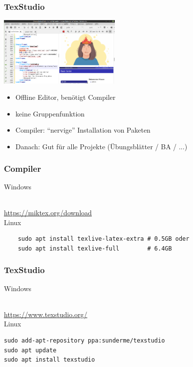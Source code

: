 \documentclass{beamer}
\begin{document}
\begin{frame}
	\frametitle{TexStudio}
	\includegraphics[width=6cm]{pictures/texstudio.png}
	\begin{itemize}[<+->]
		\item Offline Editor, benötigt Compiler
		\item keine Gruppenfunktion
		\item Compiler: ``nervige'' Installation von Paketen
		\item Danach: Gut für alle Projekte (Übungsblätter / BA / ...)
	\end{itemize}
\end{frame}

\begin{frame}[fragile]
	\frametitle{Compiler}
	Windows\vspace{2mm}
	\centering

	\\
	\url{https://miktex.org/download}\\
	\vspace{5mm}
	\hline
	\vspace{5mm}
	Linux
	\begin{verbatim}
	sudo apt install texlive-latex-extra # 0.5GB oder
	sudo apt install texlive-full        # 6.4GB
	\end{verbatim}
\end{frame}

\begin{frame}[fragile]
	\frametitle{TexStudio}
	Windows\vspace{2mm}
	\centering

	\\
	\url{https://www.texstudio.org/}\\
	\vspace{5mm}
	\hline
	\vspace{5mm}
	Linux
	\begin{verbatim}
sudo add-apt-repository ppa:sunderme/texstudio
sudo apt update
sudo apt install texstudio
\end{verbatim}
\end{frame}
\end{document}
